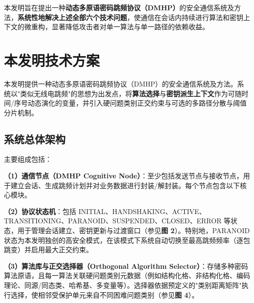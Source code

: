 ﻿\documentclass[12pt,a4paper]{article}
\begin{document}
本发明旨在提出一种\textbf{动态多原语密码跳频协议（DMHP）}的安全通信系统及方法，\textbf{系统性地解决上述全部六个技术问题}，使通信在会话内持续进行算法和密钥上下文的微重构，显著降低攻击者对单一算法与单一路径的依赖收益。

\section{本发明技术方案}

本发明提供一种动态多原语密码跳频协议（DMHP）的安全通信系统及方法。系统以"类似无线电跳频"的思想为出发点，将\textbf{算法选择}与\textbf{密钥派生上下文}作为可随时间/序号动态演化的变量，并引入硬问题类别正交约束与可选的多路径分散与阈值分片机制。

\subsection{系统总体架构}

主要组成包括：

\textbf{（1）通信节点（DMHP Cognitive Node）}：至少包括发送节点与接收节点，用于建立会话、生成跳频计划并对业务数据进行封装/解封装。每个节点包含以下核心模块。

\textbf{（2）协议状态机}：包括 INITIAL、HANDSHAKING、ACTIVE、TRANSITIONING、PARANOID、SUSPENDED、CLOSED、ERROR 等状态，用于管理会话建立、密钥更新与过渡窗口（参见\textbf{图 2}）。特别地，PARANOID状态为本发明独创的高安全模式，在该模式下系统自动切换至最高跳频频率（逐包跳变）并启用最大正交约束。

\textbf{（3）算法库与正交选择器（Orthogonal Algorithm Selector）}：存储多种密码算法原语，且每一算法关联硬问题类别元数据（例如结构化格、非结构化格、编码理论、同源/同态类、哈希基、多变量等）。选择器依据预定义的"类别距离矩阵"执行选择，使相邻受保护单元来自不同困难问题类别（参见\textbf{图 4}）。
\end{document}

